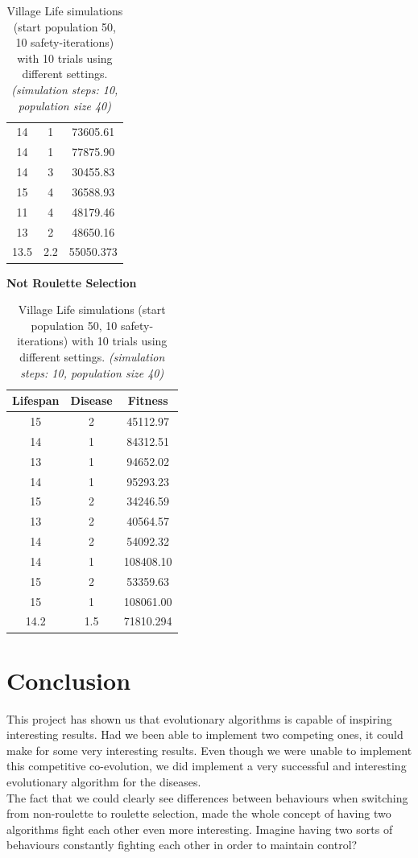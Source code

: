 \documentclass[conference,compsoc]{IEEEtran}
\begin{document}
\begin{table}[!t]
\begin{center}
\begin{minipage}{0.25\textwidth}
\begin{tabular}{|c|c|c|}
	14 & 1 & 73605.61\\
	14 & 1 & 77875.90\\
	14 & 3 & 30455.83\\
	15 & 4 & 36588.93\\
	11 & 4 & 48179.46\\
	13 & 2 & 48650.16\\
	\hline
	13.5 & 2.2 & 55050.373\\
	\hline
	\end{tabular}
\end{minipage}%
\begin{minipage}{0.25\textwidth}
\centering
\textbf{Not Roulette Selection}\\
	\begin{tabular}{|c|c|c|}
	\hline
	Lifespan & Disease & Fitness\\
	\hline
	15 & 2 &  45112.97\\
	14 & 1 &  84312.51\\
	13 & 1 &  94652.02\\
	14 & 1 &  95293.23\\
	15 & 2 &  34246.59\\
	13 & 2 &  40564.57\\
	14 & 2 &  54092.32\\
	14 & 1 & 108408.10\\
	15 & 2 &  53359.63\\
	15 & 1 & 108061.00\\
	\hline
	14.2 & 1.5 & 71810.294\\
	\hline
	\end{tabular}
\end{minipage}%
\end{center}
\caption{Village Life simulations (start population 50, 10 safety-iterations) with 10 trials using different settings. \textit{(simulation steps: 10, population size 40)}}
\label{fig:SettingsExperiment}
\end{table}

\section{Conclusion} 
This project has shown us that evolutionary algorithms is capable of inspiring interesting results. Had we been able to implement two competing ones, it could make for some very interesting results. Even though we were unable to implement this competitive co-evolution, we did implement a very successful and interesting evolutionary algorithm for the diseases.\\ 
The fact that we could clearly see differences between behaviours when switching from non-roulette to roulette selection, made the whole concept of having two algorithms fight each other even more interesting. Imagine having two sorts of behaviours constantly fighting each other in order to maintain control?\\
\end{document}
